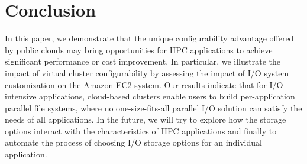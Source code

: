 \section{Conclusion}
    \label{sec:conclusion}
    In this paper, we demonstrate that the unique configurability advantage
    offered by public clouds may bring opportunities for HPC applications to
    achieve significant performance or cost improvement. In particular, we
    illustrate the impact of virtual cluster configurability by assessing the
    impact of I/O system customization on the Amazon EC2 system. Our results
    indicate that for I/O-intensive applications, cloud-based clusters enable
    users to build per-application parallel file systems, where no
    one-size-fits-all parallel I/O solution can satisfy the needs of all
    applications. In the future, we will try to explore how the storage
    options interact with the characteristics of HPC applications and finally
    to automate the process of choosing I/O storage options for an individual
    application.
